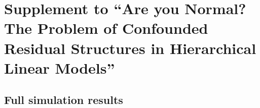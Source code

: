 \documentclass[12pt]{article} %
\newcommand{\trans}{\ensuremath{^\prime}}
\newcommand{\var}{\ensuremath{\mathrm{Var}}}
\begin{document}
%
%
%
%





\clearpage

\appendix
\section{Supplement to ``Are you Normal? The Problem of Confounded Residual Structures in Hierarchical Linear Models''}

\subsection{Full simulation results}
\end{document}
